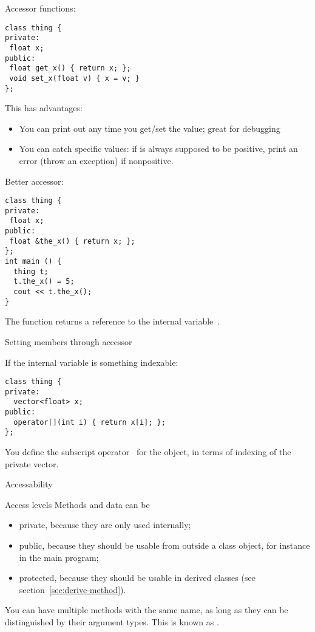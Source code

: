 Accessor functions:
\begin{verbatim}
class thing {
private:
 float x;
public:
 float get_x() { return x; };
 void set_x(float v) { x = v; }
};
\end{verbatim}
This has advantages:
\begin{itemize}
\item You can print out any time you get/set the value; great for
  debugging
\item You can catch specific values: if  is always supposed to be
  positive, print an error (throw an exception) if nonpositive.
\end{itemize}

Better accessor:
\begin{verbatim}
class thing {
private:
 float x;
public:
 float &the_x() { return x; };
};
int main () {
  thing t;
  t.the_x() = 5;
  cout << t.the_x();
}
\end{verbatim}
The function  returns a reference to the internal
variable~.

\begin{block}{Setting members through accessor}
  \label{sl:setmember}
\end{block}

If the internal variable is something indexable:
\begin{verbatim}
class thing {
private:
  vector<float> x;
public:
  operator[](int i) { return x[i]; };
};
\end{verbatim}
You define the subscript operator~\n{[]} for the object, in terms of
indexing of the private vector.

 {Accessability}

\begin{slide}{Access levels}
  \label{sl:private-etc}
  Methods and data can be 
  \begin{itemize}
  \item private, because they are only used internally;
  \item public, because they should be usable from outside a class
    object, for instance in the main program;
  \item protected, because they should be usable in derived classes (see
    section~\ref{sec:derive-method}).
  \end{itemize}
\end{slide}

You can have multiple methods with the same name, as long as they can
be distinguished by their argument types. This is known as .

